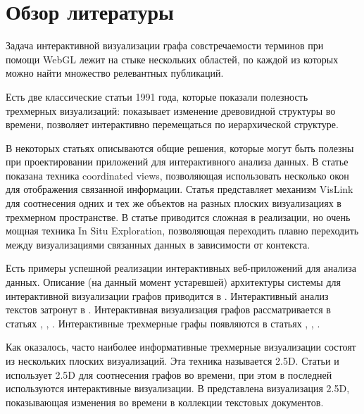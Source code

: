 \section*{Обзор литературы}
\label{sec:lit_review}

Задача интерактивной визуализации графа совстречаемости терминов при помощи WebGL лежит на стыке нескольких областей, по каждой из которых можно найти множество релевантных публикаций.

Есть две классические статьи 1991 года, которые показали полезность трехмерных визуализаций: \cite{classic_ecologies} показывает изменение древовидной структуры во времени, \cite{classic_3d_trees} позволяет интерактивно перемещаться по иерархической структуре.

В некоторых статьях описываются общие решения, которые могут быть полезны при проектировании приложений для интерактивного анализа данных. В статье \cite{interactive_coordinated_views} показана техника coordinated views, позволяющая использовать несколько окон для отображения связанной информации. Статья \cite{25d_vislink} представляет механизм VisLink для соотнесения одних и тех же объектов на разных плоских визуализациях в трехмерном пространстве. В статье \cite{in_situ} приводится сложная в реализации, но очень мощная техника In Situ Exploration, позволяющая переходить плавно переходить между визуализациями связанных данных в зависимости от контекста.

Есть примеры успешной реализации интерактивных веб-приложений для анализа данных. Описание (на данный момент устаревшей) архитектуры системы для интерактивной визуализации графов приводится в \cite{scalable_web}. Интерактивный анализ текстов затронут в \cite{interactive_document_exploration}. Интерактивная визуализация графов рассматривается в статьях \cite{interactive_relations}, \cite{interactive_large_graph}, \cite{interactive_tpp}. Интерактивные трехмерные графы появляются в статьях \cite{interactive_3d_graph}, \cite{interactive_graph_3d_fast}, \cite{graph_interactive}.

Как оказалось, часто наиболее информативные трехмерные визуализации состоят из нескольких плоских визуализаций. Эта техника называется 2.5D. Статьи \cite{25d_simultaneous} и \cite{25d_interactive_graph} использует 2.5D для соотнесения графов во времени, при этом в последней используются интерактивные визуализации. В \cite{25d_bloggers} представлена визуализация 2.5D, показывающая изменения во времени в коллекции текстовых документов. 

